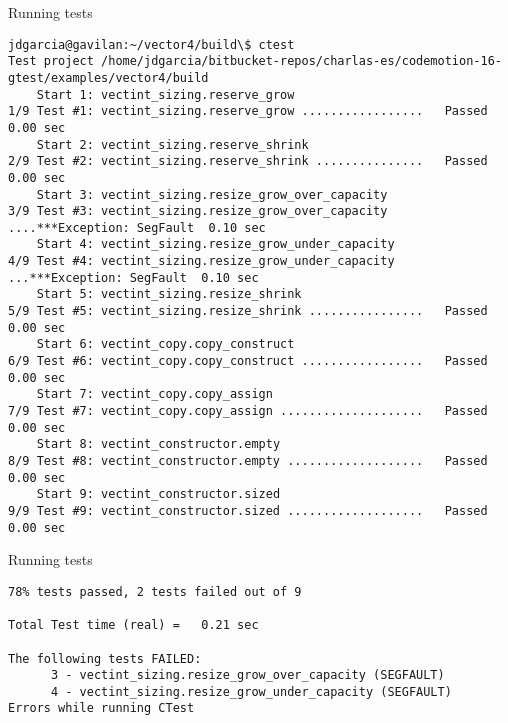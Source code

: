 \begin{frame}[t,fragile]{Running tests}
\begin{lstlisting}[style=terminal,basicstyle=\tiny\ttfamily]
jdgarcia@gavilan:~/vector4/build\$ ctest
Test project /home/jdgarcia/bitbucket-repos/charlas-es/codemotion-16-gtest/examples/vector4/build
    Start 1: vectint_sizing.reserve_grow
1/9 Test #1: vectint_sizing.reserve_grow .................   Passed    0.00 sec
    Start 2: vectint_sizing.reserve_shrink
2/9 Test #2: vectint_sizing.reserve_shrink ...............   Passed    0.00 sec
    Start 3: vectint_sizing.resize_grow_over_capacity
3/9 Test #3: vectint_sizing.resize_grow_over_capacity ....***Exception: SegFault  0.10 sec
    Start 4: vectint_sizing.resize_grow_under_capacity
4/9 Test #4: vectint_sizing.resize_grow_under_capacity ...***Exception: SegFault  0.10 sec
    Start 5: vectint_sizing.resize_shrink
5/9 Test #5: vectint_sizing.resize_shrink ................   Passed    0.00 sec
    Start 6: vectint_copy.copy_construct
6/9 Test #6: vectint_copy.copy_construct .................   Passed    0.00 sec
    Start 7: vectint_copy.copy_assign
7/9 Test #7: vectint_copy.copy_assign ....................   Passed    0.00 sec
    Start 8: vectint_constructor.empty
8/9 Test #8: vectint_constructor.empty ...................   Passed    0.00 sec
    Start 9: vectint_constructor.sized
9/9 Test #9: vectint_constructor.sized ...................   Passed    0.00 sec
\end{lstlisting}
\end{frame}

\begin{frame}[t,fragile]{Running tests}
\begin{lstlisting}[style=terminal,basicstyle=\tiny\ttfamily]
78% tests passed, 2 tests failed out of 9

Total Test time (real) =   0.21 sec

The following tests FAILED:
	  3 - vectint_sizing.resize_grow_over_capacity (SEGFAULT)
	  4 - vectint_sizing.resize_grow_under_capacity (SEGFAULT)
Errors while running CTest
\end{lstlisting}
\end{frame}

